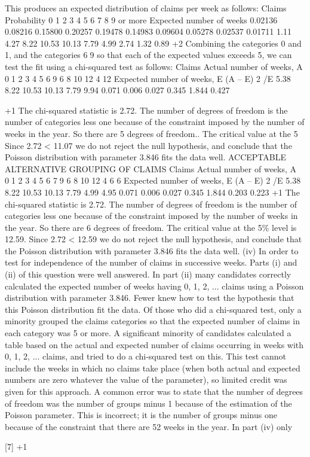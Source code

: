 \documentclass[a4paper,12pt]{article}
\begin{document}
This produces an expected distribution of claims per week as follows:
Claims
Probability
0
1
2
3
4
5
6
7
8
9 or more
Expected number of weeks
0.02136
0.08216
0.15800
0.20257
0.19478
0.14983
0.09604
0.05278
0.02537
0.01711
1.11
4.27
8.22
10.53
10.13
7.79
4.99
2.74
1.32
0.89
+2
Combining the categories 0 and 1, and the categories 69 so that
each of the expected values exceeds 5, we can test the fit using a
chi-squared test as follows:
Claims
Actual number
of weeks, A
01
2
3
4
5
69
6
8
10
12
4
12
Expected number
of weeks, E (A – E) 2 /E
5.38
8.22
10.53
10.13
7.79
9.94 0.071
0.006
0.027
0.345
1.844
0.427

+1
The chi-squared statistic is 2.72. 
The number of degrees of freedom is the number of categories less one
because of the constraint imposed by the number of weeks in the year. 
So there are 5 degrees of freedom.. 
The critical value at the 5%
Since 2.72 < 11.07 
we do not reject the null hypothesis, and conclude that the
Poisson distribution with parameter 3.846 fits the data well. 
ACCEPTABLE ALTERNATIVE GROUPING OF CLAIMS
Claims
Actual number
of weeks, A
01
2
3
4
5
6
79
6
8
10
12
4
6
6
Expected number
of weeks, E (A – E) 2 /E
5.38
8.22
10.53
10.13
7.79
4.99
4.95 0.071
0.006
0.027
0.345
1.844
0.203
0.223
+1
The chi-squared statistic is 2.72. 
The number of degrees of freedom is the number of categories less one because of the constraint imposed by the number of weeks in the year. 
So there are 6 degrees of freedom. 
The critical value at the 5\% level is 12.59. 
Since 2.72 < 12.59 
we do not reject the null hypothesis, and conclude that the
Poisson distribution with parameter 3.846 fits the data well.
(iv)
In order to test for independence of the number of claims in
successive weeks.
Parts (i) and (ii) of this question were well answered. In part (ii) many candidates correctly calculated the expected number of weeks having 0, 1, 2, ... claims using a Poisson distribution with parameter 3.846. Fewer knew how to test the hypothesis that this Poisson distribution fit the data. Of those who did a chi-squared test, only a minority grouped the claims categories so
that the expected number of claims in each category was 5 or more. A
significant minority of candidates calculated a table based on the actual and expected number of claims occurring in weeks with 0, 1, 2, ... claims, and tried to do a chi-squared test on this. This test cannot include the weeks in
which no claims take place (when both actual and expected numbers are zero whatever the value of the parameter), so limited credit was given for this approach. A common error was to state that the number of degrees of freedom was the number of groups minus 1 because of the estimation of the
Poisson parameter. This is incorrect; it is the number of groups minus one
because of the constraint that there are 52 weeks in the year. In part (iv) only

[7]
+1

\end{document}
